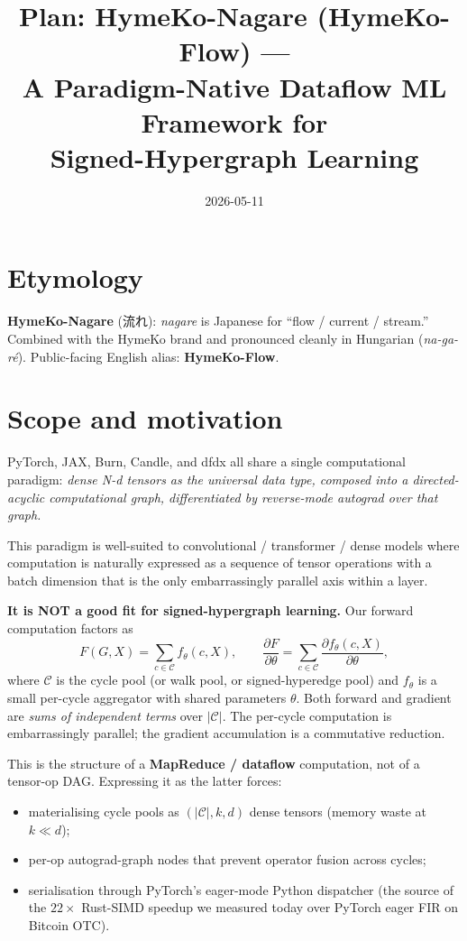 \documentclass[10pt]{article}
\title{Plan: \textbf{HymeKo-Nagare} (HymeKo-Flow) ---\\
  A Paradigm-Native Dataflow ML Framework for\\
  Signed-Hypergraph Learning}
\author{}
\date{2026-05-11}
\begin{document}
\maketitle

\section*{Etymology}

\textbf{HymeKo-Nagare} (流れ): \emph{nagare} is Japanese for ``flow / current
/ stream.'' Combined with the HymeKo brand and pronounced cleanly in
Hungarian (\emph{na-ga-ré}). Public-facing English alias:
\textbf{HymeKo-Flow}.

\section*{Scope and motivation}

PyTorch, JAX, Burn, Candle, and dfdx all share a single computational
paradigm: \emph{dense N-d tensors as the universal data type, composed
into a directed-acyclic computational graph, differentiated by
reverse-mode autograd over that graph.}

This paradigm is well-suited to convolutional / transformer / dense
models where computation is naturally expressed as a sequence of
tensor operations with a batch dimension that is the only embarrassingly
parallel axis within a layer.

\textbf{It is NOT a good fit for signed-hypergraph learning.} Our
forward computation factors as
\[
  F(G, X) = \sum_{c \in \mathcal{C}} f_\theta(c, X),
  \qquad
  \frac{\partial F}{\partial \theta} = \sum_{c \in \mathcal{C}}
      \frac{\partial f_\theta(c, X)}{\partial \theta},
\]
where $\mathcal{C}$ is the cycle pool (or walk pool, or signed-hyperedge
pool) and $f_\theta$ is a small per-cycle aggregator with shared
parameters $\theta$. Both forward and gradient are \emph{sums of
independent terms} over $|\mathcal{C}|$. The per-cycle computation is
embarrassingly parallel; the gradient accumulation is a commutative
reduction.

This is the structure of a \textbf{MapReduce / dataflow} computation,
not of a tensor-op DAG. Expressing it as the latter forces:
\begin{itemize}
  \item materialising cycle pools as $(|\mathcal{C}|, k, d)$ dense
    tensors (memory waste at $k \ll d$);
  \item per-op autograd-graph nodes that prevent operator fusion
    across cycles;
  \item serialisation through PyTorch's eager-mode Python dispatcher
    (the source of the $22\times$ Rust-SIMD speedup we measured
    today over PyTorch eager FIR on Bitcoin OTC).
\end{itemize}
\end{document}
